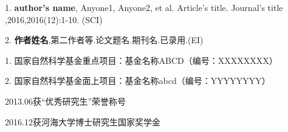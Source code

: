 
\begin{resume}


\begin{publications}
	\item[1.] \textbf{author's name}, Anyone1, Anyone2, et al. Article's title. Journal's title ,2016,2016(12):1-10. (SCI)
	\item[2.] \textbf{作者姓名},第二作者等.论文题名.期刊名.已录用.(EI)	
\end{publications}


\begin{projects}
	\item[1.] 国家自然科学基金重点项目：基金名称ABCD（编号：XXXXXXXX）
	\item[2.] 国家自然科学基金面上项目：基金名称abcd（编号：YYYYYYYY）
\end{projects}


\begin{honours}
	\item 2013.06\hspace{1em}获“优秀研究生”荣誉称号
	\item 2016.12\hspace{1em}获河海大学博士研究生国家奖学金
\end{honours}

\end{resume}
